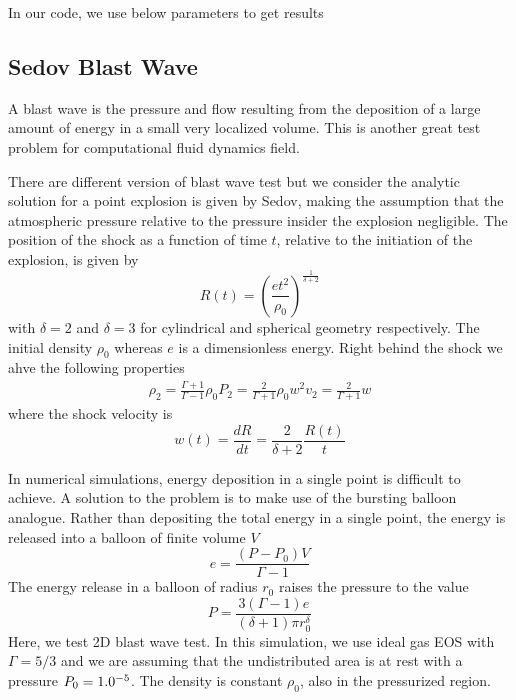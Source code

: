 \documentclass{article}
\begin{document}
In our code, we use below parameters to get results

\subsection{Sedov Blast Wave}
A blast wave is the pressure and flow resulting from the deposition of a large amount of energy in a small very localized volume. This is another great test problem for computational fluid dynamics field.

There are different version of blast wave test but we consider the analytic solution for a point explosion is given by Sedov, making the assumption that the atmospheric pressure relative to the pressure insider the explosion negligible. The position of the shock as a function of time $t$, relative to the initiation of the explosion, is given by
\begin{equation}
R(t) = \left( \frac{e t^2}{\rho_0} \right)^{\frac{1}{\delta+2}}
\end{equation}
with $\delta = 2$ and $\delta = 3$ for cylindrical and spherical geometry respectively. The initial density $\rho_0$ whereas $e$ is a dimensionless energy. Right behind the shock we ahve the following properties
\begin{align}
\rho_2 = \frac{\Gamma +1}{\Gamma-1} \rho_0
P_2 = \frac{2}{\Gamma+1} \rho_0 w^2
v_2 = \frac{2}{\Gamma+1} w
\end{align}
where the shock velocity is
\begin{equation}
w(t) = \frac{d R}{dt} = \frac{2}{\delta+2} \frac{R(t)}{t}
\end{equation}

In numerical simulations, energy deposition in a single point is difficult to achieve. A solution to the problem is to make use of the bursting balloon analogue. Rather than depositing the total energy in a single point, the energy is released into a balloon of finite volume $V$
\begin{equation}
e = \frac{(P-P_0)V}{\Gamma -1}
\end{equation}
The energy release in a balloon of radius $r_0$ raises the pressure to the value
\begin{equation}
P = \frac{3(\Gamma-1)e}{(\delta+1) \pi r_0^{\delta}}
\end{equation}
Here, we test 2D blast wave test. In this simulation, we use ideal gas EOS with $\Gamma = 5/3$ and we are assuming that the undistributed area is at rest with a pressure $P_0 = 1.0 \time 10^{-5}$. The density is constant $\rho_0$, also in the pressurized region.
\end{document}

